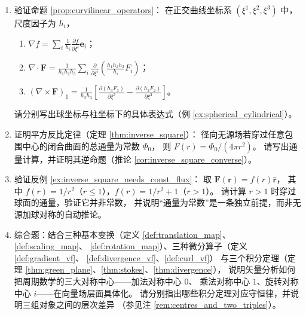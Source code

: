 \begin{enumerate}[leftmargin=3em, label=\textbf{题 \arabic*}]
    \item 验证命题 \ref{prop:curvilinear_operators}：
    在正交曲线坐标系 $(\xi^1,\xi^2,\xi^3)$ 中，尺度因子为 $h_i$，
    \begin{enumerate}[label=(\roman*)]
        \item $\nabla f=\sum_i\frac{1}{h_i}\frac{\partial f}{\partial\xi^i}\mathbf{e}_i$；
        \item $\nabla\cdot\mathbf{F}=\frac{1}{h_1h_2h_3}\sum_i
              \frac{\partial}{\partial\xi^i}\left(\frac{h_1h_2h_3}{h_i}F_i\right)$；
        \item $(\nabla\times\mathbf{F})_1=\frac{1}{h_2h_3}
              \left[\frac{\partial(h_3F_3)}{\partial\xi^2}
              -\frac{\partial(h_2F_2)}{\partial\xi^3}\right]$。
    \end{enumerate}
    请分别写出球坐标与柱坐标下的具体表达式（例 \ref{ex:spherical_cylindrical}）。

    \item 证明平方反比定律（定理 \ref{thm:inverse_square}）：
    径向无源场若穿过任意包围中心的闭合曲面的总通量为常数 $\Phi_0$，
    则 $F(r)=\Phi_0/(4\pi r^2)$。
    请写出通量计算，并证明其逆命题（推论 \ref{cor:inverse_square_converse}）。

    \item 验证反例 \ref{ex:inverse_square_needs_const_flux}：
    取 $\mathbf{F}(\mathbf{r})=f(r)\hat{\mathbf{r}}$，
    其中 $f(r)=1/r^2$（$r\le1$），$f(r)=1/r^2+1$（$r>1$）。
    请计算 $r>1$ 时穿过球面的通量，验证它并非常数，
    并说明“通量为常数”是一条独立前提，而非无源加球对称的自动推论。

    \item 综合题：结合三种基本变换（定义 \ref{def:translation_map}、\ref{def:scaling_map}、
    \ref{def:rotation_map}）、三种微分算子（定义 \ref{def:gradient_vf}、
    \ref{def:divergence_vf}、\ref{def:curl_vf}）
    与三个积分定理（定理 \ref{thm:green_plane}、\ref{thm:stokes}、\ref{thm:divergence}），
    说明矢量分析如何把周期数学的三大对称中心——加法对称中心 $0$、
    乘法对称中心 $1$、旋转对称中心 $i$——在向量场层面具体化。
    请分别指出哪些积分定理对应守恒律，并说明三组对象之间的层次差异
    （参见注 \ref{rem:centres_and_two_triples}）。
\end{enumerate}

